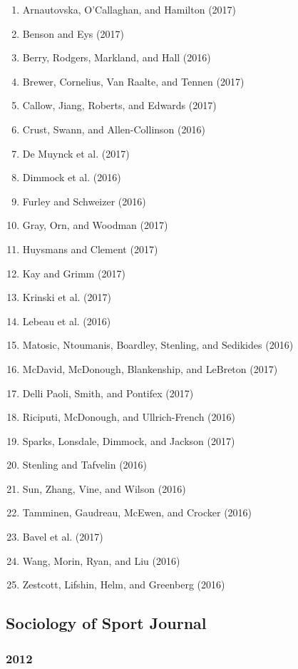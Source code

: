 \documentclass[english,man]{apa6}
\providecommand{\tightlist}{%
  \setlength{\itemsep}{0pt}\setlength{\parskip}{0pt}}
\theoremstyle{definition}
\theoremstyle{definition}
\theoremstyle{definition}
\theoremstyle{remark}
\begin{document}
\begin{enumerate}
\def\labelenumi{\arabic{enumi})}
\tightlist
\item
  Arnautovska, O'Callaghan, and Hamilton (2017)
\item
  Benson and Eys (2017)
\item
  Berry, Rodgers, Markland, and Hall (2016)
\item
  Brewer, Cornelius, Van Raalte, and Tennen (2017)
\item
  Callow, Jiang, Roberts, and Edwards (2017)
\item
  Crust, Swann, and Allen-Collinson (2016)
\item
  De Muynck et al. (2017)
\item
  Dimmock et al. (2016)
\item
  Furley and Schweizer (2016)
\item
  Gray, Orn, and Woodman (2017)
\item
  Huysmans and Clement (2017)
\item
  Kay and Grimm (2017)
\item
  Krinski et al. (2017)
\item
  Lebeau et al. (2016)
\item
  Matosic, Ntoumanis, Boardley, Stenling, and Sedikides (2016)
\item
  McDavid, McDonough, Blankenship, and LeBreton (2017)
\item
  Delli Paoli, Smith, and Pontifex (2017)
\item
  Riciputi, McDonough, and Ullrich-French (2016)
\item
  Sparks, Lonsdale, Dimmock, and Jackson (2017)
\item
  Stenling and Tafvelin (2016)
\item
  Sun, Zhang, Vine, and Wilson (2016)
\item
  Tamminen, Gaudreau, McEwen, and Crocker (2016)
\item
  Bavel et al. (2017)
\item
  Wang, Morin, Ryan, and Liu (2016)
\item
  Zestcott, Lifshin, Helm, and Greenberg (2016)
\end{enumerate}

\subsection{Sociology of Sport
Journal}\label{sociology-of-sport-journal}

\subsubsection{2012}\label{section-52}
\end{document}
